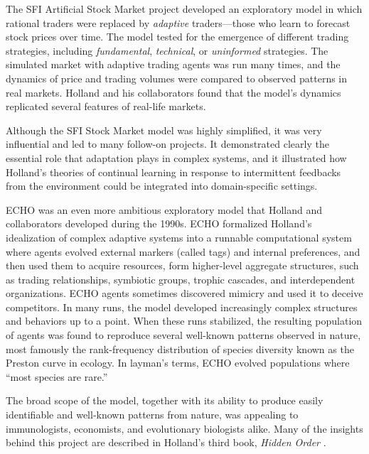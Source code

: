 \documentclass{sig-alternate}
\begin{document}
The SFI Artificial Stock Market project \cite{Arthur1997b,Palmer1994}
developed an exploratory model in which rational
traders were replaced by \emph{adaptive} traders---those who learn to
forecast stock prices over time.  The model tested for the
emergence of different trading strategies, including
\emph{fundamental}, \emph{technical}, or \emph{uninformed}
strategies. The simulated market with adaptive trading agents was run
many times, and the dynamics of price and trading volumes were
compared to observed patterns in real markets.  Holland and his
collaborators found that the model's dynamics replicated several
features of real-life markets.

Although the SFI Stock Market model was highly simplified, it was very
influential and led to many follow-on projects.  It 
demonstrated clearly the essential role that adaptation plays in complex
systems, and it illustrated how Holland's theories of continual learning
in response to intermittent feedbacks from the environment could be
integrated into domain-specific settings.

ECHO \cite{Holland1999,Hraber1997} was an even more ambitious exploratory model
that Holland and collaborators developed during the 1990s. 
ECHO formalized Holland's idealization of complex adaptive systems
into a runnable computational system where agents evolved external
markers (called tags) and internal preferences, and then used them to
acquire resources, form higher-level aggregate structures, such as
trading relationships, symbiotic groups, trophic cascades, and
interdependent organizations.  ECHO agents sometimes discovered
mimicry and used it to deceive competitors.  In many runs, the model
developed increasingly complex structures and behaviors up to a point.
When these runs stabilized, the resulting population of agents was
found to reproduce several well-known patterns observed in nature,
most famously the rank-frequency distribution of species diversity
known as the Preston curve in ecology.  In layman's terms, ECHO
evolved populations where ``most species are rare.''

The broad scope of the model, together with its ability to produce
easily identifiable and well-known patterns from nature, was appealing
to immunologists, economists, and evolutionary biologists alike.  Many
of the insights behind this project are described in Holland's third
book, \emph{Hidden Order} \cite{Holland1995}.  
\end{document}
